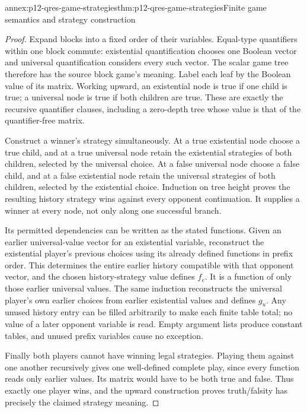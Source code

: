\begin{annexitem}{annex:p12-qres-game-strategies}{thm:p12-qres-game-strategies}{Finite game semantics and strategy construction}
\begin{proof}
Expand blocks into a fixed order of their variables.  Equal-type quantifiers
within one block commute: existential quantification chooses one Boolean
vector and universal quantification considers every such vector.  The scalar
game tree therefore has the source block game's meaning.  Label each leaf
by the Boolean value of its matrix.  Working upward, an existential node is
true if one child is true; a universal node is true if both children are true.
These are exactly the recursive quantifier clauses, including a zero-depth
tree whose value is that of the quantifier-free matrix.

Construct a winner's strategy simultaneously.  At a true existential node
choose a true child, and at a true universal node retain the existential
strategies of both children, selected by the universal choice.  At a false
universal node choose a false child, and at a false existential node retain
the universal strategies of both children, selected by the existential
choice.  Induction on tree height proves the resulting history strategy
wins against every opponent continuation.  It supplies a winner at every
node, not only along one successful branch.

Its permitted dependencies can be written as the stated functions.  Given
an earlier universal-value vector for an existential variable, reconstruct
the existential player's previous choices using its already defined
functions in prefix order.  This determines the entire earlier history
compatible with that opponent vector, and the chosen history-strategy value
defines \(f_e\).  It is a function of only those earlier universal values.
The same induction reconstructs the universal player's own earlier choices
from earlier existential values and defines \(g_u\).  Any unused history
entry can be filled arbitrarily to make each finite table total; no value
of a later opponent variable is read.  Empty argument lists produce constant
tables, and unused prefix variables cause no exception.

Finally both players cannot have winning legal strategies.  Playing them
against one another recursively gives one well-defined complete play,
since every function reads only earlier values.  Its matrix would have to
be both true and false.  Thus exactly one player wins, and the upward
construction proves truth/falsity has precisely the claimed strategy meaning.
\end{proof}
\end{annexitem}

